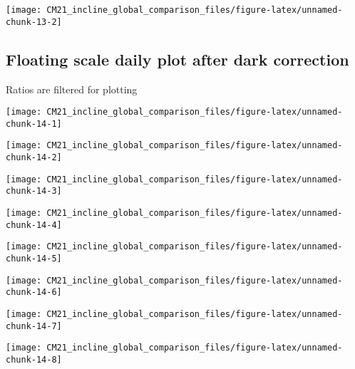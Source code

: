 \documentclass[
  10pt,
  a4paper,oneside]{article}
\begin{document}
\begin{center}\texttt{[image: CM21\_incline\_global\_comparison\_files/figure-latex/unnamed-chunk-13-2]} \end{center}

\newpage

\hypertarget{floating-scale-daily-plot-after-dark-correction}{%
\subsection{Floating scale daily plot after dark correction}\label{floating-scale-daily-plot-after-dark-correction}}

Ratios are filtered for plotting

\begin{center}\texttt{[image: CM21\_incline\_global\_comparison\_files/figure-latex/unnamed-chunk-14-1]} \end{center}

\begin{center}\texttt{[image: CM21\_incline\_global\_comparison\_files/figure-latex/unnamed-chunk-14-2]} \end{center}

\begin{center}\texttt{[image: CM21\_incline\_global\_comparison\_files/figure-latex/unnamed-chunk-14-3]} \end{center}

\begin{center}\texttt{[image: CM21\_incline\_global\_comparison\_files/figure-latex/unnamed-chunk-14-4]} \end{center}

\begin{center}\texttt{[image: CM21\_incline\_global\_comparison\_files/figure-latex/unnamed-chunk-14-5]} \end{center}

\begin{center}\texttt{[image: CM21\_incline\_global\_comparison\_files/figure-latex/unnamed-chunk-14-6]} \end{center}

\begin{center}\texttt{[image: CM21\_incline\_global\_comparison\_files/figure-latex/unnamed-chunk-14-7]} \end{center}

\begin{center}\texttt{[image: CM21\_incline\_global\_comparison\_files/figure-latex/unnamed-chunk-14-8]} \end{center}
\end{document}
